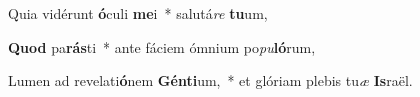 \item Quia vidérunt \textbf{ó}culi \textbf{me}i~* salutá\textit{re} \textbf{tu}um,
\item \textbf{Quod} pa\textbf{rás}ti~* ante fáciem ómnium po\textit{pu}\textbf{ló}rum,
\item Lumen ad revelati\textbf{ó}nem \textbf{Gén}\textbf{ti}um,~* et glóriam plebis tu\textit{æ} \textbf{Is}raël.
